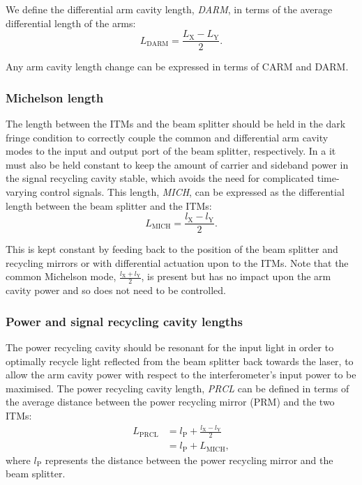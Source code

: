 We define the differential arm cavity length, \emph{\gls{DARM}}, in terms of the average differential length of the arms:
\begin{equation}
  L_{\text{DARM}} = \frac{L_{\text{X}} - L_{\text{Y}}}{2}.
\end{equation}

Any arm cavity length change can be expressed in terms of \gls{CARM} and \gls{DARM}.

\subsubsection{Michelson length}
The length between the \glspl{ITM} and the beam splitter should be held in the dark fringe condition to correctly couple the common and differential arm cavity modes to the input and output port of the beam splitter, respectively. In a \DRFPMI{} it must also be held constant to keep the amount of carrier and sideband power in the signal recycling cavity stable, which avoids the need for complicated time-varying control signals. This length, \emph{\gls{MICH}}, can be expressed as the differential length between the beam splitter and the \glspl{ITM}:
\begin{equation}
  L_{\text{MICH}} = \frac{l_{\text{X}} - l_{\text{Y}}}{2}.
\end{equation}

This is kept constant by feeding back to the position of the beam splitter and recycling mirrors or with differential actuation upon to the \glspl{ITM}. Note that the common Michelson mode, $\frac{l_{\text{X}} + l_{\text{Y}}}{2}$, is present but has no impact upon the arm cavity power and so does not need to be controlled.

\subsubsection{Power and signal recycling cavity lengths}
The power recycling cavity should be resonant for the input light in order to optimally recycle light reflected from the beam splitter back towards the laser, to allow the arm cavity power with respect to the interferometer's input power to be maximised. The power recycling cavity length, \emph{\gls{PRCL}} can be defined in terms of the average distance between the power recycling mirror (\gls{PRM}) and the two \glspl{ITM}:
\begin{equation}
  \label{eq:prcl-length}
  \begin{split}
    L_{\text{PRCL}} &= l_{\text{P}} + \frac{l_{\text{X}} - l_{\text{Y}}}{2} \\
		    &= l_{\text{P}} + L_{\text{MICH}},
  \end{split}
\end{equation}
where $l_{\text{P}}$ represents the distance between the power recycling mirror and the beam splitter.

